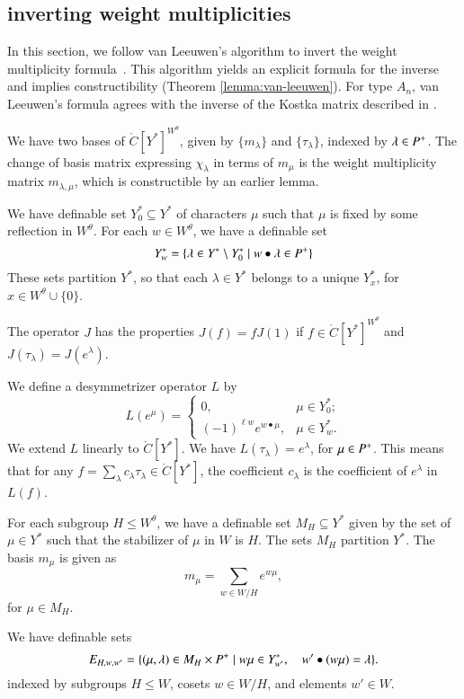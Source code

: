 \subsection{inverting weight multiplicities}

In this section, we follow  van Leeuwen's algorithm to invert the weight multiplicity
formula~\cite{vanleeuwen}.  This algorithm yields an explicit formula for the inverse and 
implies constructibility (Theorem \ref{lemma:van-leeuwen}).
For type $A_n$, van Leeuwen's formula agrees with the inverse of the Kostka
matrix described in \cite{duan}.

We have two bases of $\ring{C}[Y^*]^{W^\theta}$, given by $\{m_\lambda\}$ and $\{\tau_\lambda\}$, indexed
by $\lambda\in P^+$.  
The change of basis matrix expressing $\chi_\lambda$ in terms of $m_\mu$ is the weight multiplicity
matrix $m_{\lambda,\mu}$, which is constructible by an earlier lemma. 

We have definable set $Y^*_0\subseteq Y^*$ of characters $\mu$ such that $\mu$ is fixed by some
reflection in $W^\theta$.  For each $w\in W^\theta$, we have a definable set 
\[
Y^*_w = \{\lambda\in Y^*\setminus Y^*_0\mid w\bullet \lambda \in P^+\}
\]
These sets partition $Y^*$, so that each $\lambda\in Y^*$ belongs to a unique $Y^*_x$, for $x\in W^\theta\cup\{0\}$.

The operator $J$ has the properties $J(f) = f J(1)$ if $f\in \ring{C}[Y^*]^{W^\theta}$ and $J(\tau_\lambda) = J(e^\lambda)$.

We define a desymmetrizer operator $L$ by
\[
L(e^\mu) = \begin{cases}
0,& \mu\in Y^*_0;\\
(-1)^{\ell{w}} e^{w\bullet \mu},& \mu\in Y^*_w.
\end{cases}
\]
We extend $L$ linearly to $\ring{C}[Y^*]$.
We have $L(\tau_\lambda) = e^\lambda$, for $\mu\in P^+$.  This means that
for any $f = \sum_\lambda c_\lambda \tau_\lambda \in \ring{C}[Y^*]$, the coefficient $c_\lambda$
is the coefficient of $e^\lambda$ in $L(f)$.

For each subgroup $H\le W^\theta$, we have a definable set
$M_H \subseteq Y^*$ given by the set of $\mu\in Y^*$ such that
the stabilizer of $\mu$ in $W$ is $H$.  
The sets $M_H$ partition $Y^*$. 
The basis $m_\mu$ is given
as 
\[
m_\mu = \sum_{w\in W/H} e^{w \mu},
\]
for $\mu\in M_H$.

We have definable sets 
\[
E_{H,w,w'} = \{(\mu,\lambda)\in M_H\times P^+ \mid w\mu\in Y^*_{w'},\quad w'\bullet(w\mu)=\lambda\}.
\]
indexed by subgroups $H\le W$, cosets $w\in W/H$, and elements $w'\in W$.

